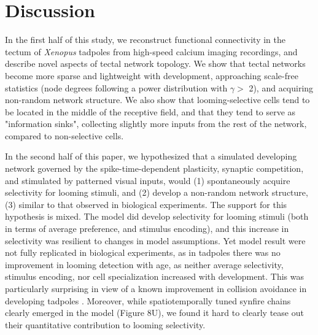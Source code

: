 \documentclass{article}
\begin{document}
\section*{Discussion}

In the first half of this study, we reconstruct functional connectivity in the tectum of \textit{Xenopus} tadpoles from high-speed calcium imaging recordings, and describe novel aspects of tectal network topology. We show that tectal networks become more sparse and lightweight with development, approaching scale-free statistics (node degrees following a power distribution with $\gamma >$ 2), and acquiring non-random network structure. We also show that looming-selective cells tend to be located in the middle of the receptive field, and that they tend to serve as "information sinks", collecting slightly more inputs from the rest of the network, compared to non-selective cells.

In the second half of this paper, we hypothesized that a simulated developing network governed by the spike-time-dependent plasticity, synaptic competition, and stimulated by patterned visual inputs, would (1) spontaneously acquire selectivity for looming stimuli, and (2) develop a non-random network structure, (3) similar to that observed in biological experiments. The support for this hypothesis is mixed. The model did develop selectivity for looming stimuli (both in terms of average preference, and stimulus encoding), and this increase in selectivity was resilient to changes in model assumptions. Yet model result were not fully replicated in biological experiments, as in tadpoles there was no improvement in looming detection with age, as neither average selectivity, stimulus encoding, nor cell specialization increased with development. This was particularly surprising in view of a known improvement in collision avoidance in developing tadpoles \citep{dong2009}. Moreover, while spatiotemporally tuned synfire chains clearly emerged in the model (Figure 8U), we found it hard to clearly tease out their quantitative contribution to looming selectivity.
\end{document}
